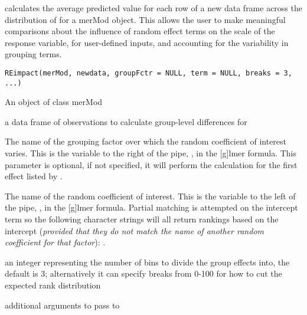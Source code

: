 \documentclass[letterpaper]{book}
\begin{document}
%
\begin{Description}\relax
{} calculates the average predicted value for each row of a
new data frame across the distribution of  for a
merMod object. This allows the user to make meaningful comparisons about the
influence of random effect terms on the scale of the response variable,
for user-defined inputs, and accounting for the variability in grouping terms.
\end{Description}
%
\begin{Usage}
\begin{verbatim}
REimpact(merMod, newdata, groupFctr = NULL, term = NULL, breaks = 3, ...)
\end{verbatim}
\end{Usage}
%
\begin{Arguments}
\begin{ldescription}
\item[\code{merMod}] An object of class merMod

\item[\code{newdata}] a data frame of observations to calculate group-level differences
for

\item[\code{groupFctr}] The name of the grouping factor over which the random
coefficient of interest varies.  This is the variable to the right of the
pipe, \code{|}, in the [g]lmer formula. This parameter is optional, if not
specified, it will perform the calculation for the first effect listed
by .

\item[\code{term}] The name of the random coefficient of interest. This is the
variable to the left of the pipe, \code{|}, in the [g]lmer formula. Partial
matching is attempted on the intercept term so the following character
strings will all return rankings based on the intercept (\emph{provided that
they do not match the name of another random coefficient for that factor}):
.

\item[\code{breaks}] an integer representing the number of bins to divide the group
effects into, the default is 3; alternatively it can specify breaks from 0-100
for how to cut the expected rank distribution

\item[\code{...}] additional arguments to pass to 
\end{ldescription}
\end{Arguments}
\end{document}
